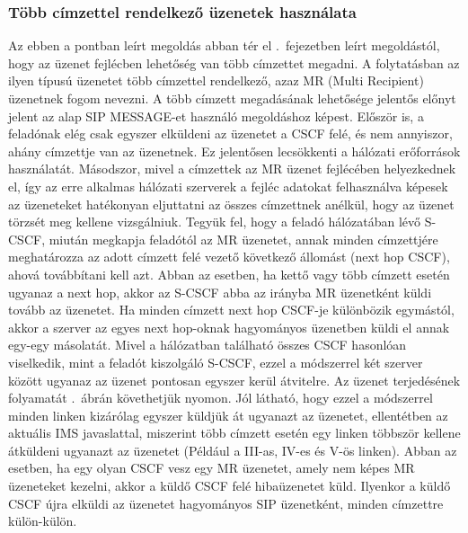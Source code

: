 \subsubsection{Több címzettel rendelkező üzenetek használata}
\label{sec:mr_message}

Az ebben a pontban leírt megoldás abban tér el .~fejezetben leírt megoldástól, hogy az üzenet fejlécben lehetőség van több címzettet megadni. A folytatásban az ilyen típusú üzenetet több címzettel rendelkező, azaz MR (Multi Recipient) üzenetnek fogom nevezni. A több címzett megadásának lehetősége jelentős előnyt jelent az alap SIP MESSAGE-et használó megoldáshoz képest. Először is, a feladónak elég csak egyszer elküldeni az üzenetet a CSCF felé, és nem annyiszor, ahány címzettje van az üzenetnek. Ez jelentősen lecsökkenti a hálózati erőforrások használatát. Másodszor, mivel a címzettek az MR üzenet fejlécében helyezkednek el, így az erre alkalmas hálózati szerverek a fejléc adatokat felhasználva képesek az üzeneteket hatékonyan eljuttatni az összes címzettnek anélkül, hogy az üzenet törzsét meg kellene vizsgálniuk. Tegyük fel, hogy a feladó hálózatában lévő S-CSCF, miután megkapja feladótól az MR üzenetet, annak minden címzettjére meghatározza az adott címzett felé vezető következő állomást (next hop CSCF), ahová továbbítani kell azt. Abban az esetben, ha kettő vagy több címzett esetén ugyanaz a next hop, akkor az S-CSCF abba az irányba MR üzenetként küldi tovább az üzenetet. Ha minden címzett next hop CSCF-je különbözik egymástól, akkor a szerver az egyes next hop-oknak hagyományos üzenetben küldi el annak egy-egy másolatát. Mivel a hálózatban található összes CSCF hasonlóan viselkedik, mint a feladót kiszolgáló S-CSCF, ezzel a módszerrel két szerver között ugyanaz az üzenet pontosan egyszer kerül átvitelre. Az üzenet terjedésének folyamatát .~ábrán követhetjük nyomon. Jól látható, hogy ezzel a módszerrel minden linken kizárólag egyszer küldjük át ugyanazt az üzenetet, ellentétben az aktuális IMS javaslattal, miszerint több címzett esetén egy linken többször kellene átküldeni ugyanazt az üzenetet (Például a III-as, IV-es és V-ös linken). Abban az esetben, ha egy olyan CSCF vesz egy MR üzenetet, amely nem képes MR üzeneteket kezelni, akkor a küldő CSCF felé hibaüzenetet küld. Ilyenkor a küldő CSCF újra elküldi az üzenetet hagyományos SIP üzenetként, minden címzettre külön-külön. 

